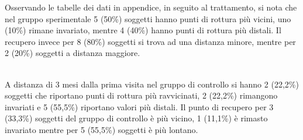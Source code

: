 Osservando le tabelle dei dati in appendice, in seguito al trattamento, si nota che nel gruppo sperimentale 5 (50\%) soggetti hanno punti di rottura più vicini, uno (10\%) rimane invariato, mentre 4 (40\%) hanno punti di rottura più distali. Il recupero invece per 8 (80\%) soggetti si trova ad una distanza minore, mentre per 2 (20\%) soggetti a distanza maggiore. 
\\\

A distanza di 3 mesi dalla prima visita nel gruppo di controllo si hanno 2 (22,2\%) soggetti che riportano punti di rottura più ravvicinati, 2 (22,2\%) rimangono invariati e 5 (55,5\%) riportano valori più distali. Il punto di recupero per 3 (33,3\%) soggetti del gruppo di controllo è più vicino, 1 (11,1\%) è rimasto invariato mentre per 5 (55,5\%) soggetti è più lontano. 

